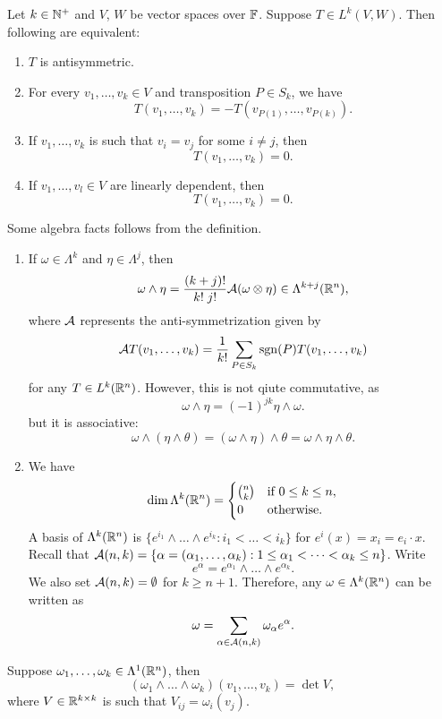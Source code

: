 \documentclass[a4paper]{article}
\begin{document}
\begin{thm}
Let $k \in \mathbb{N}^+$ and $V$, $W$ be vector spaces over $\mathbb{F}$. 
Suppose $T \in L^k(V, W)$. Then following are equivalent:
\begin{enumerate}
\item $T$ is antisymmetric. 
\item For every $v_1, \dots, v_k \in V$ and transposition 
$P \in S_k$, we have 
\[
T(v_1, \dots, v_k) = -T (v_{P(1)}, \dots, v_{P(k)}).
\]
\item If $v_1, \dots, v_k$ is such that $v_i = v_j$ for some 
$i \neq j$, then 
\[
T(v_1, \dots, v_k) = 0.
\]
\item If $v_1, \dots, v_l \in V$ are linearly dependent, 
then 
\[
T(v_1, \dots, v_k) = 0.
\]
\end{enumerate}
\end{thm}

Some algebra facts follows from the definition.
\begin{enumerate}
\item If $\omega \in \Lambda^k$ and $\eta \in \Lambda^j$,
then
\[
\omega \wedge \eta = \frac{(k+j)!}{k! \; j!} \mathcal{A} (\omega
\otimes \eta) \in \Lambda^{k+j}(\mathbb{R}^n),
\]
where $\mathcal{A}$ represents the anti-symmetrization given by 
\[
\mathcal{A} T(v_1, \dots, v_k) = \frac{1}{k!} 
\sum_{P \in S_k} \operatorname{sgn}(P) T(v_1, \dots, v_k)
\]
for any $T \in L^k(\mathbb{R}^n)$. 
However, this is not qiute commutative, as
\[
\omega \wedge \eta = (-1)^{jk} \eta \wedge \omega.
\]
but it is associative:
\[
\omega \wedge (\eta \wedge \theta)
= (\omega \wedge \eta) \wedge \theta
= \omega \wedge \eta \wedge \theta.
\]

\item We have
\[
\dim \Lambda^k(\mathbb{R}^n) = \begin{cases}
  \binom{n}{k} & \text{if $0 \leq k \leq n$},\\
  0 & \text{otherwise}.
\end{cases}
\]
A basis of $\Lambda^k (\mathbb{R}^n)$ is
$\{e^{i_1} \wedge \dots \wedge e^{i_k} : i_1 < \dots < i_k\}$
for $e^i (x) = x_i = e_i \cdot x$.
Recall that $\mathcal{A}(n, k) = \{\alpha = (\alpha_1, \dots,
\alpha_k) : 1 \leq \alpha_1 < \dots < \alpha_k \leq n\}$.
Write
\[
e^{\alpha} = e^{\alpha_1} \wedge \dots \wedge
e^{\alpha_k}.
\]
We also set $\mathcal{A}(n, k) = \emptyset$
for $k \geq n + 1$.
Therefore, any $\omega \in \Lambda^k(\mathbb{R}^n)$
can be written as
\[
\omega = \sum_{\alpha \in \mathcal{A}(n, k)}
\omega_\alpha e^{\alpha}.
\]
\end{enumerate}

\begin{prop} 
Suppose $\omega_1, \dots, \omega_k \in \Lambda^1 
(\mathbb{R}^n)$, then 
\[
(\omega_1 \wedge \dots \wedge \omega_k) 
(v_1, \dots, v_k) = \det V,
\]
where $V \in \mathbb{R}^{k \times k}$ is such that $V_{ij} = \omega_i 
(v_j)$.
\end{prop}
\end{document}

